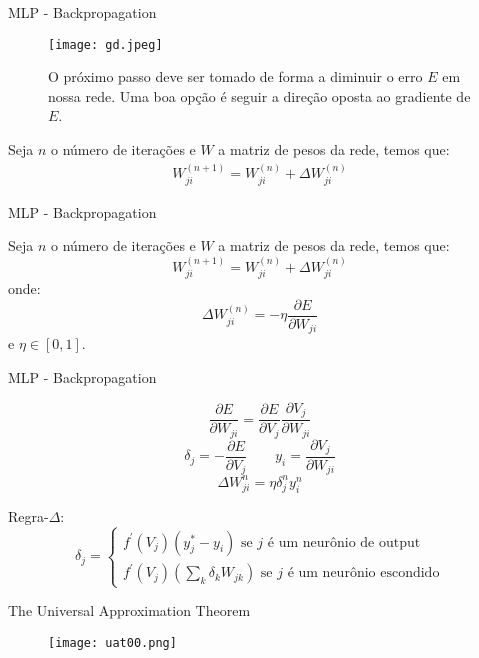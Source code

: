 \begin{frame}{MLP - Backpropagation}

\begin{figure}[t]
  \texttt{[image: gd.jpeg]}
  \caption{O próximo passo deve ser tomado de forma a diminuir o erro $E$ em nossa rede. Uma boa opção é seguir a direção oposta ao gradiente de $E$.}
  \centering
\end{figure}

Seja $n$ o número de iterações e $W$ a matriz de pesos da rede, temos que:
\begin{align*}
  W^{(n+1)}_{ji} = W^{(n)}_{ji} + \Delta W^{(n)}_{ji}
\end{align*}

\end{frame}

\begin{frame}{MLP - Backpropagation}

Seja $n$ o número de iterações e $W$ a matriz de pesos da rede, temos que:
\[ W^{(n+1)}_{ji} = W^{(n)}_{ji} + \Delta W^{(n)}_{ji} \]
onde:
\[ \Delta W^{(n)}_{ji} = -\eta \frac{\partial E}{\partial W_{ji}} \]
e $\eta \in [0, 1]$.

\end{frame}

\begin{frame}{MLP - Backpropagation}

\[ \frac{\partial E}{\partial W_{ji}} = \frac{\partial E}{\partial V_j} \frac{\partial V_j}{\partial W_{ji}} \]
\[ \delta_j = - \frac{\partial E}{\partial V_j} \qquad y_i = \frac{\partial V_j}{\partial W_{ji}} \]
\[ \Delta W^n_{ji} = \eta \delta^n_j y^n_i \]

\begin{block}{Regra-$\Delta$:}
\[
  \delta_j =
    \begin{cases}
      f^\prime(V_j)(y^\ast_j - y_i) \text{ se $j$ é um neurônio de output}\\
      f^\prime(V_j)(\sum_{k} \delta_k W_{jk}) \text{ se $j$ é um neurônio escondido}
    \end{cases}
\]
\end{block}

\end{frame}

\begin{frame}{The Universal Approximation Theorem}
  \begin{figure}[t]
    \texttt{[image: uat00.png]}
    \centering
  \end{figure}
\end{frame}
